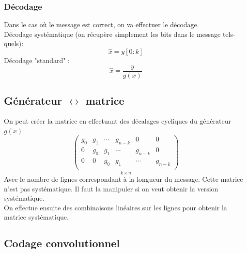 \documentclass[resume.tex]{subfiles}
\begin{document}
\subsubsection{Décodage}
Dans le cas où le message est correct, on va effectuer le décodage.\\
Décodage systématique (on récupère simplement les bits dans le message tels-quels):
$$\hat{x}=y[0:k]$$
Décodage "standard" :
$$\hat{x}=\frac{y}{g(x)}$$
\subsection{Générateur $\leftrightarrow$ matrice}
On peut créer la matrice en effectuant des décalages cycliques du générateur $g(x)$
$$\underset{k\times n}{\begin{pmatrix}
g_0 & g_1 & \cdots & g_{n-k} & 0 & 0\\
0 & g_0 & g_1 & \cdots & g_{n-k} & 0\\
0 & 0 & g_0 & g_1 & \cdots & g_{n-k}\\
\end{pmatrix}}$$
Avec le nombre de lignes correspondant à la longueur du message. Cette matrice n'est pas systématique. Il faut la manipuler si on veut obtenir la version systématique.\\
On effectue ensuite des combinaisons linéaires sur les lignes pour obtenir la matrice systématique.
\subsection{Codage convolutionnel}
\end{document}
